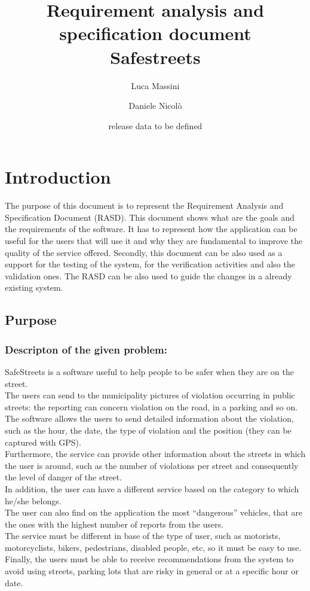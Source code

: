 \documentclass[titlepage]{article}
\author{Luca Massini \and Daniele Nicolò}
\title{Requirement analysis and specification document
\\ Safestreets}
\date{release data to be defined}
\begin{document}
\maketitle

\section{Introduction}
The purpose of this document is to represent the Requirement Analysis and Specification Document (RASD).
This document shows what are the goals and the requirements of the software.
It has to represent how the application can be useful for the users that will use it and why they are fundamental to improve the quality of the service offered. Secondly, this document can be also used as a support for the testing of the system, for the verification activities and also the validation ones. The RASD can be also used to guide the changes in a already existing system.
\subsection{Purpose}

\subsubsection{Descripton of the given problem:}
SafeStreets is a software useful to help people to be safer when they are on the street.\\
The users can send to the municipality pictures of violation occurring in public streets: the reporting can concern violation on the road, in a parking and so on.\\
The software allows the users to send detailed information about the violation, such as the hour, the date, the type of violation and the position (they can be captured with GPS).\\
Furthermore, the service can provide other information about the streets in which the user is around,
such as the number of violations per street and consequently the level of danger of the street.\\
In addition, the user can have a different service based on the category to which he/she belongs.\\
The user can also find on the application the most “dangerous” vehicles, that are the ones with the highest number of reports from the users.\\
The service must be different in base of the type of user, such as motorists, motorcyclists, bikers, pedestrians, disabled people, etc, so it must be easy to use.\\
Finally, the users must be able to receive recommendations from the system to avoid using streets, parking lots that are risky in general or at a specific hour or date.
\end{document}
